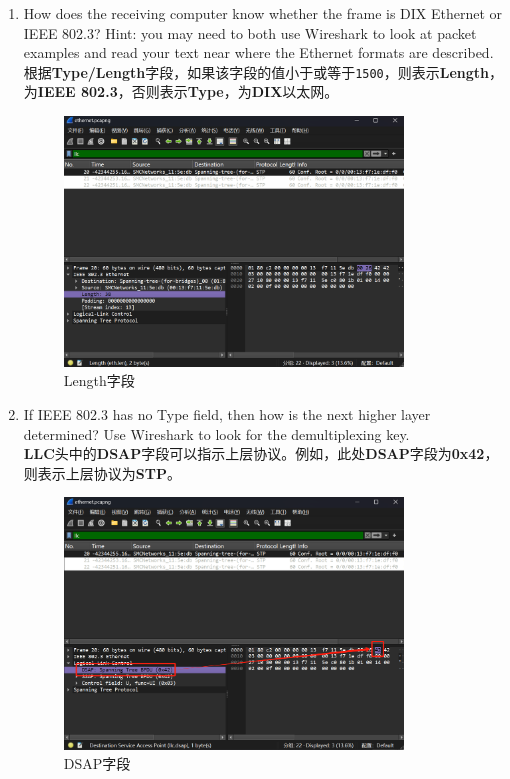 \documentclass{article}
\begin{document}
\begin{enumerate}[noitemsep, label={{\arabic*})}]
		\item How does the receiving computer know whether the frame is DIX Ethernet or IEEE 802.3? Hint: you may need to both use Wireshark to look at packet examples and read your text near where the Ethernet formats are described.\\
		
		根据\textbf{Type/Length}字段，如果该字段的值小于或等于\texttt{1500}，则表示\textbf{Length}，为\textbf{IEEE 802.3}，否则表示\textbf{Type}，为\textbf{DIX}以太网。
		
		\begin{figure}[H]
			\centering
			\includegraphics[width=9cm]{images/23.Length字段.png}
			\caption{Length字段}
		\end{figure}
		
		\item If IEEE 802.3 has no Type field, then how is the next higher layer determined? Use Wireshark to look for the demultiplexing key.\\
		
		\textbf{LLC}头中的\textbf{DSAP}字段可以指示上层协议。例如，此处\textbf{DSAP}字段为\textbf{0x42}，则表示上层协议为\textbf{STP}。
		
		\begin{figure}[H]
			\centering
			\includegraphics[width=9cm]{images/24.DSAP字段.png}
			\caption{DSAP字段}
		\end{figure}
		
	\end{enumerate}
	
\end{document}
